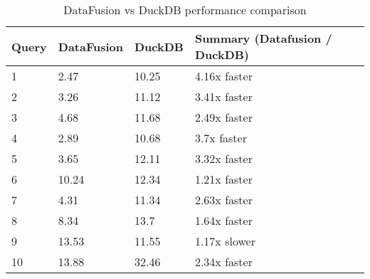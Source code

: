 \begin{table}[h]
\centering
\begin{tabular}{|l|l|l|l|}
\hline
Query & DataFusion & DuckDB & Summary (Datafusion / DuckDB) \\
\hline
1 & 2.47 & 10.25 & 4.16x faster \\
\hline
2 & 3.26 & 11.12 & 3.41x faster \\
\hline
3 & 4.68 & 11.68 & 2.49x faster \\
\hline
4 & 2.89 & 10.68 & 3.7x faster \\
\hline
5 & 3.65 & 12.11 & 3.32x faster \\
\hline
6 & 10.24 & 12.34 & 1.21x faster \\
\hline
7 & 4.31 & 11.34 & 2.63x faster \\
\hline
8 & 8.34 & 13.7 & 1.64x faster \\
\hline
9 & 13.53 & 11.55 & 1.17x slower \\
\hline
10 & 13.88 & 32.46 & 2.34x faster \\
\hline
\end{tabular}
\caption{DataFusion vs DuckDB performance comparison}
\label{table:1}
\end{table}